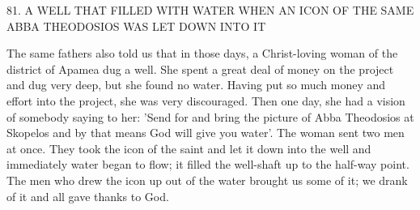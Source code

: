 81.
A WELL THAT FILLED WITH WATER
WHEN AN ICON OF THE SAME
ABBA THEODOSIOS WAS LET DOWN INTO IT

The same fathers also told us that in those days, a Christ-loving
woman of the district of Apamea dug a well.
She spent a great deal
of money on the project and dug very deep, but she found no water.
Having put so much money and effort into the project, she was very
discouraged.
Then one day, she had a vision of somebody saying to
her: 'Send for and bring the picture of Abba Theodosios at
Skopelos and by that means God will give you water'.
The woman
sent two men at once.
They took the icon of the saint and let it
down into the well and immediately water began to flow; it filled the
well-shaft up to the half-way point.
The men who drew the icon up
out of the water brought us some of it; we drank of it and all gave
thanks to God.

